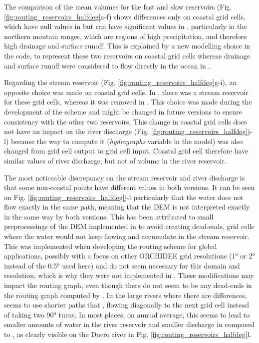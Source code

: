 The comparison of the mean volumes for the fast and slow reservoirs (Fig. \ref{fig:routing_reservoirs_halfdeg}a-f) shows differences only on coastal grid cells, which have null values in \std but can have significant values in \native, particularly in the northern moutain ranges, which are regions of high precipitation, and therefore high drainage and surface runoff. %
This is explained by a new modelling choice in the \native code, to represent these two reservoirs on coastal grid cells whereas drainage and surface runoff were considered to flow directly in the ocean in \std. %

Regarding the stream reservoir (Fig. \ref{fig:routing_reservoirs_halfdeg}g-i), an opposite choice was made on coastal grid cells. In \std, there was a stream reservoir for these grid cells, whereas it was removed in \native. This choice was made during the development of the scheme and might be changed in future versions to ensure consistency with the other two reservoirs. 
This change in coastal grid cells does not have an impact on the river discharge (Fig. \ref{fig:routing_reservoirs_halfdeg}j-l) because the way to compute it (\textit{hydrographs} variable in the model) was also changed from grid cell output to grid cell input. Coastal grid cell therefore have similar values of river discharge, but not of volume in the river reservoir. 

The most noticeable discrepancy on the stream reservoir and river discharge is that some non-coastal points have different values in both versions. It can be seen on Fig. \ref{fig:routing_reservoirs_halfdeg}j-l particularly that the water does not flow exactly in the same path, meaning that the DEM is not interpreted exactly in the same way by both versions. This has been attributed to small preprocessings of the DEM implemented in \std to avoid creating dead-ends, grid cells where the water would not keep flowing and accumulate in the stream reservoir. This was implemented when developing the routing scheme for global applications, possibly with a focus on other ORCHIDEE grid resolutions (1° or 2° instead of the 0.5° used here) and do not seem necessary for this domain and resolution, which is why they were not implemented in \native. These modifications may impact the routing graph, even though there do not seem to be any dead-ends in the routing graph computed by \native. In the large rivers where there are differences, \native seems to use shorter paths that \std, flowing diagonally to the next grid cell instead of taking two 90° turns. In most places, on annual average, this seems to lead to smaller amounts of water in the river reservoir and smaller discharge in \native compared to \std, as clearly visible on the Duero river in Fig. \ref{fig:routing_reservoirs_halfdeg}l.

